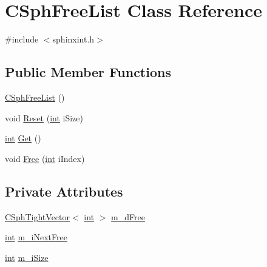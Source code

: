 \hypertarget{classCSphFreeList}{\section{C\-Sph\-Free\-List Class Reference}
\label{classCSphFreeList}
}


{\ttfamily \#include $<$sphinxint.\-h$>$}

\subsection*{Public Member Functions}
\begin{DoxyCompactItemize}
\item 
\hyperlink{classCSphFreeList_aeb8b2e75198cab8f136c6c02f653fb59}{C\-Sph\-Free\-List} ()
\item 
void \hyperlink{classCSphFreeList_a2f3320e57b19f7a889aa98e1c9646117}{Reset} (\hyperlink{sphinxexpr_8cpp_a4a26e8f9cb8b736e0c4cbf4d16de985e}{int} i\-Size)
\item 
\hyperlink{sphinxexpr_8cpp_a4a26e8f9cb8b736e0c4cbf4d16de985e}{int} \hyperlink{classCSphFreeList_afddca2e1ef95ac2d2b5b699808e6e785}{Get} ()
\item 
void \hyperlink{classCSphFreeList_a1f270039e76d165eb1a90bbe90f3dc38}{Free} (\hyperlink{sphinxexpr_8cpp_a4a26e8f9cb8b736e0c4cbf4d16de985e}{int} i\-Index)
\end{DoxyCompactItemize}
\subsection*{Private Attributes}
\begin{DoxyCompactItemize}
\item 
\hyperlink{classCSphTightVector}{C\-Sph\-Tight\-Vector}$<$ \hyperlink{sphinxexpr_8cpp_a4a26e8f9cb8b736e0c4cbf4d16de985e}{int} $>$ \hyperlink{classCSphFreeList_a91ad8304b4799ac956a2265db527a643}{m\-\_\-d\-Free}
\item 
\hyperlink{sphinxexpr_8cpp_a4a26e8f9cb8b736e0c4cbf4d16de985e}{int} \hyperlink{classCSphFreeList_a5643145c0784c147e431092808855402}{m\-\_\-i\-Next\-Free}
\item 
\hyperlink{sphinxexpr_8cpp_a4a26e8f9cb8b736e0c4cbf4d16de985e}{int} \hyperlink{classCSphFreeList_a8d56e2f416d19cdd266dd867062c58f2}{m\-\_\-i\-Size}
\end{DoxyCompactItemize}


